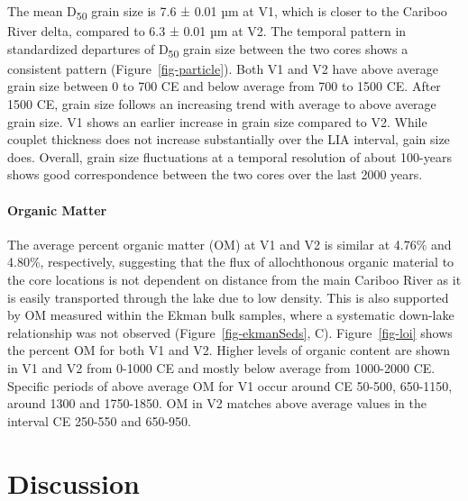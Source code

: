 \documentclass[
  letterpaper,
  DIV=11,
  numbers=noendperiod]{scrartcl}
\let\oldparagraph\paragraph
\renewcommand{\paragraph}[1]{\oldparagraph{#1}\mbox{}}
\begin{document}
The mean D\textsubscript{50} grain size is 7.6 ± 0.01 µm at V1, which is
closer to the Cariboo River delta, compared to 6.3 ± 0.01 µm at V2. The
temporal pattern in standardized departures of D\textsubscript{50} grain
size between the two cores shows a consistent pattern
(Figure~\ref{fig-particle}). Both V1 and V2 have above average grain
size between 0 to 700 CE and below average from 700 to 1500 CE. After
1500 CE, grain size follows an increasing trend with average to above
average grain size. V1 shows an earlier increase in grain size compared
to V2. While couplet thickness does not increase substantially over the
LIA interval, gain size does. Overall, grain size fluctuations at a
temporal resolution of about 100-years shows good correspondence between
the two cores over the last 2000 years.

\hypertarget{organic-matter}{%
\paragraph{Organic Matter}\label{organic-matter}}

The average percent organic matter (OM) at V1 and V2 is similar at
4.76\% and 4.80\%, respectively, suggesting that the flux of
allochthonous organic material to the core locations is not dependent on
distance from the main Cariboo River as it is easily transported through
the lake due to low density. This is also supported by OM measured
within the Ekman bulk samples, where a systematic down-lake relationship
was not observed (Figure~\ref{fig-ekmanSeds}, C). Figure~\ref{fig-loi}
shows the percent OM for both V1 and V2. Higher levels of organic
content are shown in V1 and V2 from 0-1000 CE and mostly below average
from 1000-2000 CE. Specific periods of above average OM for V1 occur
around CE 50-500, 650-1150, around 1300 and 1750-1850. OM in V2 matches
above average values in the interval CE 250-550 and 650-950.

\hypertarget{discussion}{%
\section{Discussion}\label{discussion}}
\end{document}
